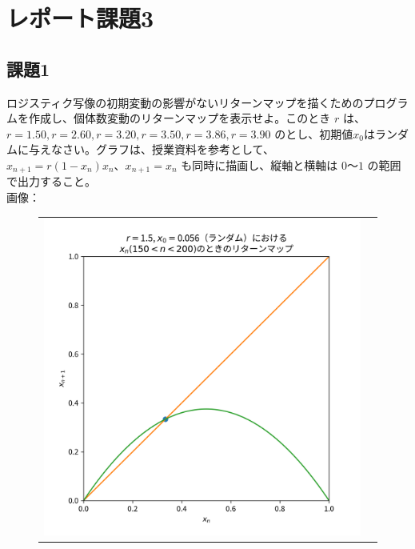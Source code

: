 \section{レポート課題3}
\subsection{課題1}
ロジスティク写像の初期変動の影響がないリターンマップを描くためのプログラムを作成し、個体数変動のリターンマップを表示せよ。このとき $r$ は、$r = 1.50, r = 2.60, r = 3.20, r = 3.50, r = 3.86, r = 3.90$ のとし、初期値$x_0$はランダムに与えなさい。グラフは、授業資料を参考として、 $x_{n+1} = r(1 − x_n)x_n、x_{n+1} = x_n$ も同時に描画し、縦軸と横軸は $0～1$ の範囲で出力すること。\\
画像：\\
\begin{figure}[htbp]
  \begin{tabular}{cc}
    \begin{minipage}[t]{0.45\hsize}
      \centering
      \includegraphics[keepaspectratio, scale=0.3]{images/Problem3/report4_1.png}
    \end{minipage} &
    \begin{minipage}[t]{0.45\hsize}
      \centering

\end{minipage}
\end{tabular}
\end{figure}
